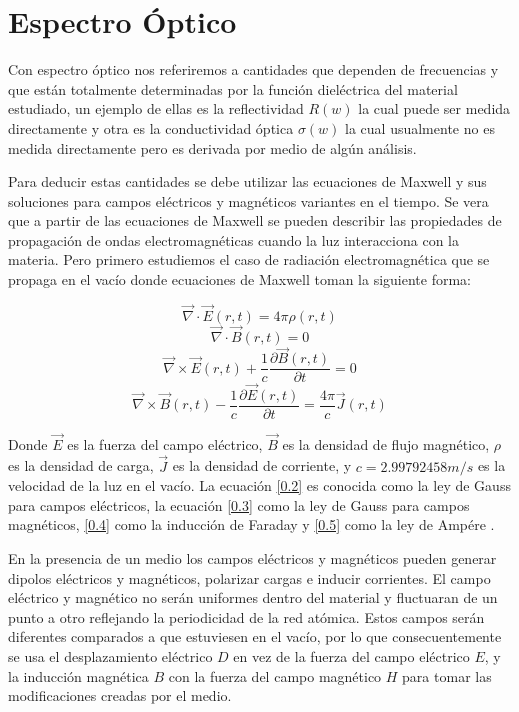 \documentclass[a4paper,openright,12pt]{book}
\begin{document}
\section{Espectro Óptico}

Con espectro óptico nos referiremos a cantidades que dependen de frecuencias y que están totalmente determinadas por la función dieléctrica del material estudiado, un ejemplo de ellas es la reflectividad $R(w)$ la cual puede ser medida directamente y otra es la conductividad óptica $\sigma(w)$ la cual usualmente no es medida directamente pero es derivada por medio de algún análisis. 

Para deducir estas cantidades se debe utilizar las  ecuaciones de Maxwell y sus  soluciones para campos eléctricos y magnéticos variantes en el tiempo. Se vera que a partir de las ecuaciones de Maxwell se pueden describir las propiedades de propagación de ondas electromagnéticas cuando la luz interacciona con la materia. Pero primero estudiemos el caso de radiación electromagnética que se propaga en el vacío donde ecuaciones de Maxwell toman la siguiente forma\cite{OpticalTechniques}:

\begin{equation}\label{0.2}
\vec{\nabla}\cdot \vec{E}(r,t)= 4\pi \rho(r,t)
\end{equation}
\begin{equation}\label{0.3}
\vec{\nabla}\cdot \vec{B}(r,t)=0
\end{equation}
\begin{equation}\label{0.4}
\vec{\nabla}\times\vec{E}(r,t)+\frac{1}{c}\frac{\partial\vec{B}(r,t)}{\partial t}=0
\end{equation}
\begin{equation}\label{0.5}
\vec{\nabla}\times\vec{B}(r,t)-\frac{1}{c}\frac{\partial \vec{E}(r,t)}{\partial t}=\frac{4\pi}{c}\vec{J}(r,t)
\end{equation}

Donde $\vec{E}$ es la fuerza del campo eléctrico, $\vec{B}$ es la densidad de flujo magnético, $\rho$ es la densidad de carga, $\vec{J}$ es la densidad de corriente, y $c=2.99792458 m/s$ es la velocidad de la luz en el vacío. La ecuación \ref{0.2} es conocida como la ley de Gauss para campos eléctricos, la ecuación \ref{0.3} como la ley de Gauss para campos magnéticos, \ref{0.4} como la inducción de Faraday y \ref{0.5} como la ley de Ampére \cite{OpticalTechniques}. 

En la presencia de un medio los campos eléctricos y magnéticos pueden generar dipolos eléctricos y magnéticos, polarizar cargas e inducir corrientes. El campo eléctrico y magnético no serán uniformes dentro del material y fluctuaran de un punto a otro reflejando la periodicidad de la red atómica. Estos campos serán diferentes comparados a que estuviesen en el vacío, por lo que consecuentemente se usa el desplazamiento eléctrico $D$ en vez de la fuerza del campo eléctrico $E$, y la inducción magnética $B$  con la fuerza del campo magnético $H$ para tomar las modificaciones creadas por el medio.
\end{document}
